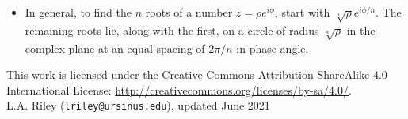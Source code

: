 \documentclass[12pt]{article}
\begin{document}
\begin{itemize}
\begin{itemize}
  \end{itemize}

\item In general, to find the $n$ roots of a number $z = \rho
  e^{i\phi}$, start with $\sqrt[n]{\rho} e^{i\phi/n}$. The remaining
  roots lie, along with the first, on a circle of radius
  $\sqrt[n]{\rho}$ in the complex plane at an equal spacing of $2\pi/n$
  in phase angle.

\end{itemize}

{\footnotesize
  \noindent
  \hrulefill
  
  \noindent
  This work is licensed under the Creative Commons
  Attribution-ShareAlike 4.0 International License: 
  \url{http://creativecommons.org/licenses/by-sa/4.0/}.\\

  \noindent
  L.A. Riley (\texttt{lriley@ursinus.edu}), updated June 2021
}
\end{document}
